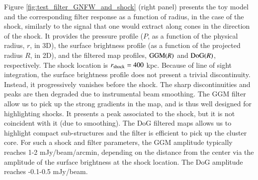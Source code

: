\documentclass[twocolumn,traditabstract]{aa}
\begin{document}
Figure \ref{fig:test_filter_GNFW_and_shock} (right panel) presents the toy model and the corresponding filter response as a function of radius, in the case of the shock, similarly to the signal that one would extract along cones in the direction of the shock. It provides the pressure profile ($P$, as a function of the physical radius, $r$, in 3D), the surface brightness profile (as a function of the projected radius $R$, in 2D), and the filtered map profiles, ${\rm GGM}(R)$ and ${\rm DoG}(R)$, respectively. The shock location is $r_{\rm shock} = 400$ kpc. Because of line of sight integration, the surface brightness profile does not present a trivial discontinuity. Instead, it progressively vanishes before the shock. The sharp discontinuities and peaks are then degraded due to instrumental beam smoothing. The GGM filter allow us to pick up the strong gradients in the map, and is thus well designed for highlighting shocks. It presents a peak associated to the shock, but it is not coincident with it (due to smoothing). The DoG filtered maps allows us to highlight compact sub-structures and the filter is efficient to pick up the cluster core. For such a shock and filter parameters, the GGM amplitude typically reaches 1-2 mJy/beam/arcmin, depending on the distance from the center via the amplitude of the surface brightness at the shock location. The DoG amplitude reaches -0.1-0.5 mJy/beam.
\end{document}
